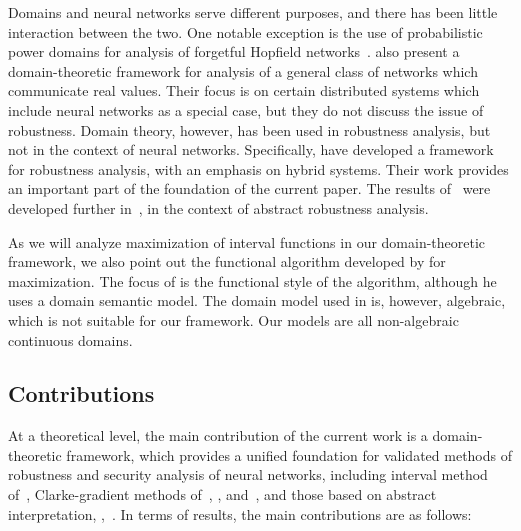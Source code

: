 \documentclass[11pt,times]{article}
\begin{document}
Domains and neural networks serve different purposes, and there has
been little interaction between the two. One notable exception is the
use of probabilistic power domains for analysis of forgetful Hopfield
networks~\parencite{Edalat:Domains_NN:1995}. \textcite{KonecnyFarjudian2010:semantics_of_query_driven,KonecnyFarjudian2010::compositional_semantics_of_dataflow}
also present a domain-theoretic framework for analysis of a general
class of networks which communicate real values. Their focus is on
certain distributed systems which include neural networks as a special
case, but they do not discuss the issue of robustness. Domain theory,
however, has been used in robustness analysis, but not in the context
of neural networks. Specifically,
\textcite{Moggi_Farjudian_Duracz_Taha:Reachability_Hybrid:2018} have
developed a framework for robustness analysis, with an emphasis on
hybrid systems. Their work provides an important part of the
foundation of the current paper. The results
of~\parencite{Moggi_Farjudian_Duracz_Taha:Reachability_Hybrid:2018}
were developed further
in~\parencite{Moggi_Farjudian_Taha:System_Analysis_and_Robustness:2019,Moggi_Farjudian_Taha:System_Analysis_and_Robustness:ICTCS:2019,Farjudian_Moggi:Robustness_Scott_Continuity_Computability:2022:arxiv},
in the context of abstract robustness analysis.

As we will analyze maximization of interval functions in our
domain-theoretic framework, we also point out the functional algorithm
developed by \textcite{Simpson:lazy_functional_algorithms:1998} for
maximization. The focus of
\textcite{Simpson:lazy_functional_algorithms:1998} is the functional
style of the algorithm, although he uses a domain semantic model. The
domain model used in \parencite{Simpson:lazy_functional_algorithms:1998}
is, however, algebraic, which is not suitable for our framework. Our
models are all non-algebraic continuous domains.


\subsection{Contributions}

At a theoretical level, the main contribution of the current work is a
domain-theoretic framework, which provides a unified foundation for
validated methods of robustness and security analysis of neural
networks, including interval method
of~\textcite{Wang_et_al:symbolic_intervals:2018}, Clarke-gradient
methods
of~\textcite{Jordan_Dimakis:Exactly_NeurIPS:2020,Jordan_Dimakis:Provable_ICML:2021},
\textcite{Bhowmick_et_al:LipBaB:2021},
and~\textcite{Laurel_et_al:Dual_Number:2022}, and those based on
abstract interpretation,
{\eg},~\parencite{Gehr_et_al:AI2:2018,Singh_et_al:Abstract_Domain_NN:2019}. In
terms of results, the main contributions are as follows:
\end{document}
